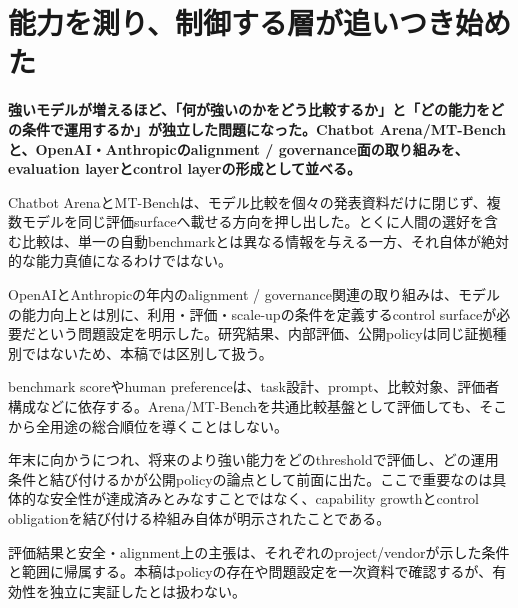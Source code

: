 \section{能力を測り、制御する層が追いつき始めた}
\noindent\textbf{強いモデルが増えるほど、「何が強いのかをどう比較するか」と「どの能力をどの条件で運用するか」が独立した問題になった。Chatbot Arena/MT-Benchと、OpenAI・Anthropicのalignment / governance面の取り組みを、evaluation layerとcontrol layerの形成として並べる。}\autocite{src-14f8acc117f1,src-1df7a91d31ec,src-25adcaa1c831,src-394ea6d17701,src-8f63dfa1697f,src-a1c8df89a3c9,src-b276b4af9d56,src-b2d10cbd609c,src-b6a5fdb87e9f}

Chatbot ArenaとMT-Benchは、モデル比較を個々の発表資料だけに閉じず、複数モデルを同じ評価surfaceへ載せる方向を押し出した。とくに人間の選好を含む比較は、単一の自動benchmarkとは異なる情報を与える一方、それ自体が絶対的な能力真値になるわけではない。\autocite{src-14f8acc117f1,src-1df7a91d31ec,src-b2d10cbd609c}


OpenAIとAnthropicの年内のalignment / governance関連の取り組みは、モデルの能力向上とは別に、利用・評価・scale-upの条件を定義するcontrol surfaceが必要だという問題設定を明示した。研究結果、内部評価、公開policyは同じ証拠種別ではないため、本稿では区別して扱う。\autocite{src-25adcaa1c831,src-394ea6d17701,src-8f63dfa1697f,src-a1c8df89a3c9,src-b276b4af9d56,src-b6a5fdb87e9f}


benchmark scoreやhuman preferenceは、task設計、prompt、比較対象、評価者構成などに依存する。Arena/MT-Benchを共通比較基盤として評価しても、そこから全用途の総合順位を導くことはしない。\autocite{src-14f8acc117f1,src-1df7a91d31ec,src-b2d10cbd609c}


年末に向かうにつれ、将来のより強い能力をどのthresholdで評価し、どの運用条件と結び付けるかが公開policyの論点として前面に出た。ここで重要なのは具体的な安全性が達成済みとみなすことではなく、capability growthとcontrol obligationを結び付ける枠組み自体が明示されたことである。\autocite{src-25adcaa1c831,src-394ea6d17701,src-8f63dfa1697f,src-a1c8df89a3c9,src-b276b4af9d56,src-b6a5fdb87e9f}


\begin{claimboundary}
評価結果と安全・alignment上の主張は、それぞれのproject/vendorが示した条件と範囲に帰属する。本稿はpolicyの存在や問題設定を一次資料で確認するが、有効性を独立に実証したとは扱わない。\autocite{src-25adcaa1c831,src-a1c8df89a3c9,src-b276b4af9d56,src-b6a5fdb87e9f}
\end{claimboundary}
